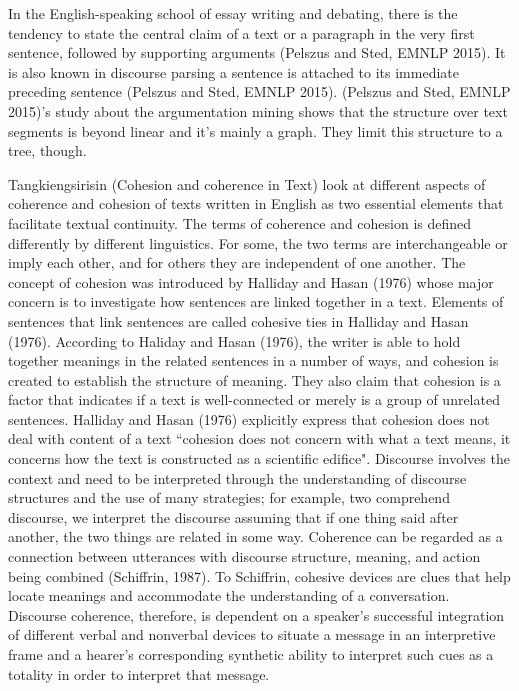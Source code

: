 In the English-speaking school of essay writing and debating, there is the tendency to state the central claim of a text or a paragraph in the very first sentence, followed by supporting arguments (Pelszus and Sted, EMNLP 2015). 
It is also known in discourse parsing a sentence is attached to its immediate preceding sentence (Pelszus and Sted, EMNLP 2015). 
(Pelszus and Sted, EMNLP 2015)'s study about the argumentation mining shows that the structure over text segments is beyond linear and it's mainly a graph. They limit this structure to a tree, though.

Tangkiengsirisin (Cohesion and coherence in Text) look at different aspects of coherence and cohesion of texts written in English as two essential elements that facilitate textual continuity. 
The terms of coherence and cohesion is defined differently by different linguistics. 
For some, the two terms are interchangeable or imply each other, and for others they are independent of one another. 
The concept of cohesion was introduced by Halliday and Hasan (1976) whose major concern is to investigate how sentences are linked together in a text. 
Elements of sentences that link sentences are called cohesive ties in Halliday and Hasan (1976). 
According to Haliday and Hasan (1976), the writer is able to hold together meanings in the related sentences in a number of ways, and cohesion is created to establish the structure of meaning. 
They also claim that cohesion is a factor that indicates if a text is well-connected or merely is a group of unrelated sentences. 
Halliday and Hasan (1976) explicitly express that cohesion does not deal with content of a text
``cohesion does not concern with what a text means, it concerns how the text is constructed as a scientific edifice". 
Discourse involves the context and need to be interpreted through the understanding of discourse structures and the use of many strategies; for example, two comprehend discourse, we interpret the discourse assuming that if one thing said after another, the two things are related in some way. 
Coherence can be regarded as a connection between utterances with discourse structure, meaning, and action being combined (Schiffrin, 1987). 
To Schiffrin, cohesive devices are clues that help locate meanings and accommodate the understanding of a conversation. 
Discourse coherence, therefore, is dependent on a speaker's successful integration of different verbal and nonverbal devices to situate a message in an interpretive frame and a hearer's corresponding synthetic ability to interpret such cues as a totality in order to interpret that message. 
